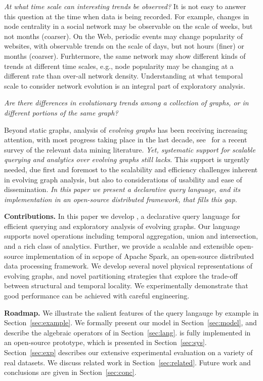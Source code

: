 {\em At what time scale can interesting trends be observed?} It is not
easy to answer this question at the time when data is being recorded.
For example, changes in node centrality in a social network may be
observable on the scale of weeks, but not months (coarser).  On the
Web, periodic events may change popularity of websites, with
observable trends on the scale of days, but not hours (finer) or
months (coarser).  Furhtermore, the same network may show different
kinds of trends at different time scales, e.g., node popularity may be
changing at a different rate than over-all network density.
Understanding at what temporal scale to consider network evolution is
an integral part of exploratory analysis.

{\em Are there differences in evolutionary trends among a collection
  of graphs, or in different portions of the same graph?}

Beyond static graphs, analysis of {\em evolving graphs} has been
receiving increasing attention, with most progress taking place in the
last decade, see~\cite{DBLP:journals/csur/AggarwalS14} for a recent
survey of the relevant data mining literature.  {\em Yet, systematic
  support for scalable querying and analytics over evolving graphs
  still lacks}.  This support is urgently needed, due first and
foremost to the scalability and efficiency challenges inherent in
evolving graph analysis, but also to considerations of usability and
ease of dissemination. {\em In this paper we present a declarative
  query language, and its implementation in an open-source distributed
  framework, that fills this gap.}

{\bf Contributions.} In this paper we develop \ql, a declarative query
language for efficient querying and exploratory analysis of evolving
graphs. Our language supports novel operations including temporal
aggregation, union and intersection, and a rich class of analytics.
Further, we provide a scalable and extensible open-source
implementation of \ql in scpope of Apache Spark, an open-source
distributed data processing framework.  We develop several novel
physical representations of evolving graphs, and novel partitioning
strategies that explore the trade-off between structural and temporal
locality.  We experimentally demonstrate that good performance can be
achieved with careful engineering.

{\bf Roadmap.}  We illustrate the salient features of the \ql query
langauge by example in Section~\ref{sec:example}.  We formally present
our model in Section~\ref{sec:model}, and describe the algebraic
operators of \ql in Section~\ref{sec:lang}.  \ql is fully implemented
in an open-source prototype, which is presented in
Section~\ref{sec:sys}.  Section~\ref{sec:exp} describes our extensive
experimental evaluation on a variety of real datasets.  We discuss
related work in Section~\ref{sec:related}.  Future work and
conclusions are given in Section~\ref{sec:conc}.

